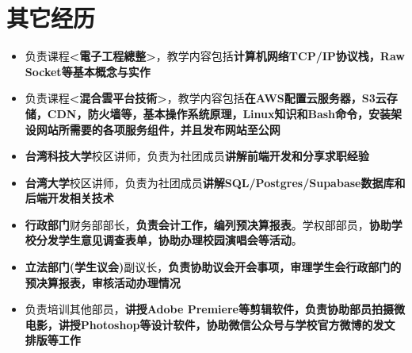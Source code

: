 \documentclass{resume}
\newcommand{\iconsection}[2]{
    \section[\texorpdfstring{#2}{#2}]{\faIcon{#1}\quad #2}
}
\begin{document}
    \iconsection{history}{其它经历}
    \begin{itemize}
        \item 负责课程\textbf{<電子工程總整>}，教学内容包括\textbf{计算机网络TCP/IP协议栈，Raw Socket等基本概念与实作}
        \item 负责课程\textbf{<混合雲平台技術>}，教学内容包括\textbf{在AWS配置云服务器，S3云存储，CDN，防火墙等，基本操作系统原理，Linux知识和Bash命令，安装架设网站所需要的各项服务组件，并且发布网站至公网}
    \end{itemize}
    \begin{itemize}
        \item \textbf{台湾科技大学}校区讲师，负责为社团成员\textbf{讲解前端开发和分享求职经验}
        \item \textbf{台湾大学}校区讲师，负责为社团成员\textbf{讲解SQL/Postgres/Supabase数据库和后端开发相关技术}
    \end{itemize}
    \begin{itemize}
        \item \textbf{行政部门}财务部部长，\textbf{负责会计工作，编列预决算报表}。学权部部员，\textbf{协助学校分发学生意见调查表单，协助办理校园演唱会等活动}。
        \item \textbf{立法部门(学生议会)}副议长，\textbf{负责协助议会开会事项，审理学生会行政部门的预决算报表，审核活动办理情况}
    \end{itemize}
    \begin{itemize}
        \item 负责培训其他部员，\textbf{讲授Adobe Premiere等剪辑软件，负责协助部员拍摄微电影，讲授Photoshop等设计软件，协助微信公众号与学校官方微博的发文排版等工作}
    \end{itemize}
\end{document}
